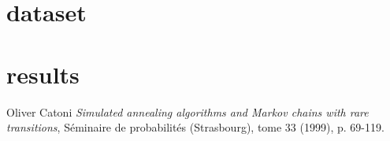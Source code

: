 \documentclass{article}
\begin{document}
\section{dataset}

\section{results}

\begin{thebibliography}{9}

Oliver Catoni
\textit{Simulated annealing algorithms and Markov chains with rare transitions}, Séminaire de probabilités (Strasbourg), tome 33 (1999), p. 69-119.

 
\end{thebibliography}
\end{document}
